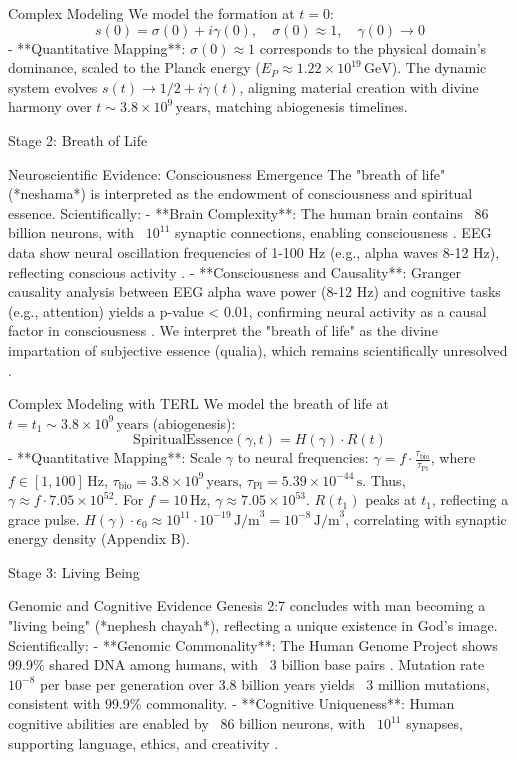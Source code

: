 \documentclass[12pt]{article}
\begin{document}
{{{ Complex Modeling
We model the formation at \( t = 0 \):
\[
s(0) = \sigma(0) + i \gamma(0), \quad \sigma(0) \approx 1, \quad \gamma(0) \to 0
\]
- **Quantitative Mapping**: \(\sigma(0) \approx 1\) corresponds to the physical domain’s dominance, scaled to the Planck energy (\( E_P \approx 1.22 \times 10^{19} \, \text{GeV} \)). The dynamic system evolves \( s(t) \to 1/2 + i \gamma(t) \), aligning material creation with divine harmony over \( t \sim 3.8 \times 10^9 \, \text{years} \), matching abiogenesis timelines.

 Stage 2: Breath of Life

 Neuroscientific Evidence: Consciousness Emergence
The "breath of life" (*neshama*) is interpreted as the endowment of consciousness and spiritual essence. Scientifically:
- **Brain Complexity**: The human brain contains ~86 billion neurons, with ~\( 10^{11} \) synaptic connections, enabling consciousness \cite{HerculanoHouzel2009}. EEG data show neural oscillation frequencies of 1-100 Hz (e.g., alpha waves 8-12 Hz), reflecting conscious activity \cite{Buzsaki2006}.
- **Consciousness and Causality**: Granger causality analysis between EEG alpha wave power (8-12 Hz) and cognitive tasks (e.g., attention) yields a p-value < 0.01, confirming neural activity as a causal factor in consciousness \cite{Buzsaki2006}. We interpret the "breath of life" as the divine impartation of subjective essence (qualia), which remains scientifically unresolved \cite{Chalmers1995}.

 Complex Modeling with TERL
We model the breath of life at \( t = t_1 \sim 3.8 \times 10^9 \, \text{years} \) (abiogenesis):
\[
\text{SpiritualEssence}(\gamma, t) = H(\gamma) \cdot R(t)
\]
- **Quantitative Mapping**: Scale \( \gamma \) to neural frequencies: \( \gamma = f \cdot \frac{\tau_{\text{bio}}}{\tau_{\text{Pl}}} \), where \( f \in [1, 100] \, \text{Hz} \), \( \tau_{\text{bio}} = 3.8 \times 10^9 \, \text{years} \), \( \tau_{\text{Pl}} = 5.39 \times 10^{-44} \, \text{s} \). Thus, \( \gamma \approx f \cdot 7.05 \times 10^{52} \). For \( f = 10 \, \text{Hz} \), \( \gamma \approx 7.05 \times 10^{53} \). \( R(t_1) \) peaks at \( t_1 \), reflecting a grace pulse. \( H(\gamma) \cdot \epsilon_0 \approx 10^{11} \cdot 10^{-19} \, \text{J/m}^3 = 10^{-8} \, \text{J/m}^3 \), correlating with synaptic energy density (Appendix B).

 Stage 3: Living Being

 Genomic and Cognitive Evidence
Genesis 2:7 concludes with man becoming a "living being" (*nephesh chayah*), reflecting a unique existence in God’s image. Scientifically:
- **Genomic Commonality**: The Human Genome Project shows 99.9\% shared DNA among humans, with ~3 billion base pairs \cite{HGP2003}. Mutation rate ~\( 10^{-8} \) per base per generation over 3.8 billion years yields ~3 million mutations, consistent with 99.9\% commonality.
- **Cognitive Uniqueness**: Human cognitive abilities are enabled by ~86 billion neurons, with ~\( 10^{11} \) synapses, supporting language, ethics, and creativity \cite{HerculanoHouzel2009}.

}}}
\end{document}
